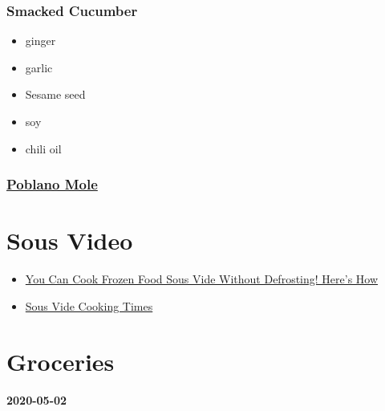 \documentclass[
]{article}
\providecommand{\tightlist}{%
  \setlength{\itemsep}{0pt}\setlength{\parskip}{0pt}}
\begin{document}
\hypertarget{smacked-cucumber}{%
\section{Smacked Cucumber}\label{smacked-cucumber}}

\begin{itemize}
\tightlist
\item
  ginger
\item
  garlic
\item
  Sesame seed
\item
  soy
\item
  chili oil
\end{itemize}

\hypertarget{poblano-mole}{%
\section{\texorpdfstring{\href{https://www.seriouseats.com/recipes/2012/10/mole-poblano-recipe-how-to-make-mole.html}{Poblano Mole}}{Poblano Mole}}\label{poblano-mole}}

\hypertarget{part-sous-video}{%
\part{Sous Video}\label{part-sous-video}}

\begin{itemize}
\tightlist
\item
  \href{https://www.chefsteps.com/activities/you-can-cook-frozen-food-sous-vide-without-defrosting-here-s-how}{You Can Cook Frozen Food Sous Vide Without Defrosting! Here's How}
\item
  \href{https://www.chefsteps.com/activities/sous-vide-time-and-temperature-guide}{Sous Vide Cooking Times}
\end{itemize}

\hypertarget{part-groceries}{%
\part{Groceries}\label{part-groceries}}

\hypertarget{section}{%
\subsection{2020-05-02}\label{section}}
\end{document}
